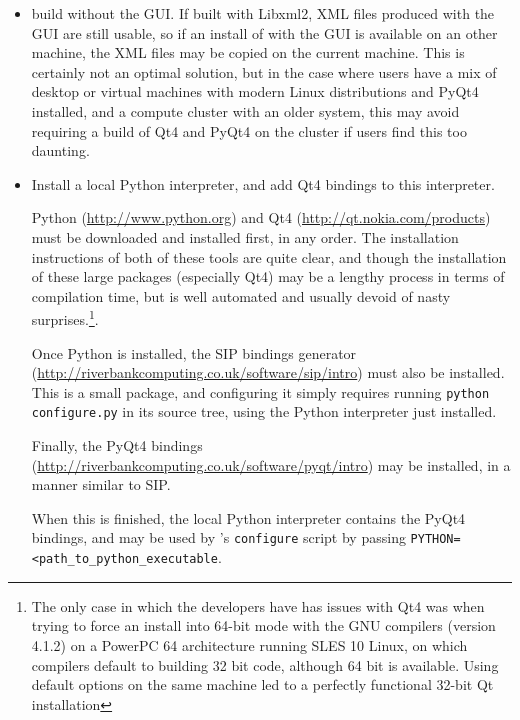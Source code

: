 \documentclass[a4paper,10pt,twoside]{csshortdoc}
\begin{document}
\begin{itemize}

\item build \CS without the GUI. If built with Libxml2, XML files
      produced with the GUI are still usable, so if an install of \CS
      with the GUI is available on an other machine, the XML files
      may be copied on the current machine. This is certainly not an optimal
      solution, but in the case where users have a mix of desktop or virtual
      machines with modern Linux distributions and PyQt4 installed, and
      a compute cluster with an older system, this may avoid requiring
      a build of Qt4 and PyQt4 on the cluster if users find this too daunting.

\item Install a local Python interpreter, and add Qt4 bindings to this
      interpreter.

      Python (\url{http://www.python.org}) and Qt4
      (\url{http://qt.nokia.com/products}) must be downloaded  and
      installed first, in any order. The installation instructions of
      both of these tools are quite clear, and though the installation of these
      large packages (especially Qt4) may be a lengthy process in terms of
      compilation time, but is well automated and usually devoid of nasty
      surprises.\footnote{The only case in which the \CS developers
      have has issues with Qt4 was when trying to force an install into
      64-bit mode with the GNU compilers (version 4.1.2) on a PowerPC 64
      architecture running SLES 10 Linux, on which compilers default
      to building 32 bit code, although 64 bit is available. Using default
      options on the same machine led to a perfectly functional 32-bit Qt
      installation}.

      Once Python is installed, the SIP bindings generator
      (\url{http://riverbankcomputing.co.uk/software/sip/intro})
      must also be installed. This is a small package, and configuring it
      simply requires running \texttt{python configure.py} in its source
      tree, using the Python interpreter just installed.

      Finally, the PyQt4 bindings
      (\url{http://riverbankcomputing.co.uk/software/pyqt/intro}) may be
      installed, in a manner similar to SIP.

      When this is finished, the local Python interpreter contains
      the PyQt4 bindings, and may be used by \CS's \texttt{configure}
      script by passing \texttt{PYTHON=<path\_to\_python\_executable}.


\end{itemize}
\end{document}

